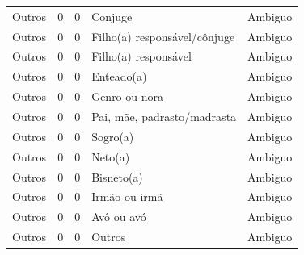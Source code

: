 \documentclass[
	12pt,				%
	openright,			%
	twoside,			%
	a4paper,			%
	english,			%
	french,				%
	spanish,			%
	brazil				%
	]{abntex2}
\begin{document}
\begin{anexosenv}
\begin{longtable}{@{}lcclc@{}}
Outros                       & 0         & 0        & Conjuge                      & Ambiguo         \\
Outros                       & 0         & 0        & Filho(a) responsável/cônjuge & Ambiguo         \\
Outros                       & 0         & 0        & Filho(a) responsável         & Ambiguo         \\
Outros                       & 0         & 0        & Enteado(a)                   & Ambiguo         \\
Outros                       & 0         & 0        & Genro ou nora                & Ambiguo         \\
Outros                       & 0         & 0        & Pai, mãe, padrasto/madrasta  & Ambiguo         \\
Outros                       & 0         & 0        & Sogro(a)                     & Ambiguo         \\
Outros                       & 0         & 0        & Neto(a)                      & Ambiguo         \\
Outros                       & 0         & 0        & Bisneto(a)                   & Ambiguo         \\
Outros                       & 0         & 0        & Irmão ou irmã                & Ambiguo         \\
Outros                       & 0         & 0        & Avô ou avó                   & Ambiguo         \\
Outros                       & 0         & 0        & Outros                       & Ambiguo         \\ \bottomrule
\end{longtable}
	
	
\end{anexosenv}


\printindex
\end{document}
